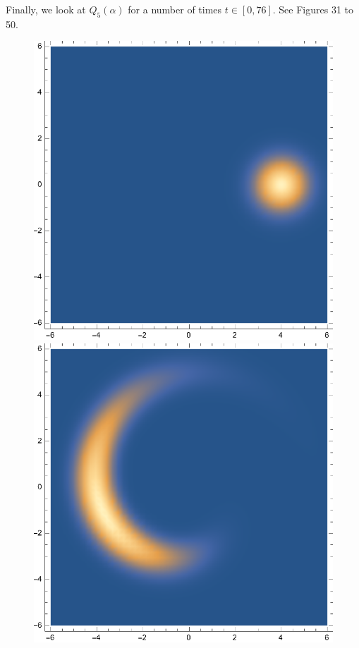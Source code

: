 \documentclass{article}
\theoremstyle{definition}
\newcommand{\al}{\alpha}
\begin{document}
\begin{enumerate}[label=\alph*)]
	Finally, we look at $Q_5(\al)$ for a number of times $t\in [0, 76]$. See Figures 31 to 50. 
	
	\begin{figure}[!htb]
	\centering
	\begin{minipage}{.24\textwidth}
  	\centering
  	\includegraphics[width=.7\linewidth]{figures/5-0.eps}
	\end{minipage}%
	\begin{minipage}{.24\textwidth}
  	\centering
  	\includegraphics[width=.7\linewidth]{figures/5-4.eps}
	\end{minipage}
	\begin{minipage}{.24\textwidth}
  	\centering

\end{minipage}
\end{figure}
\end{enumerate}
\end{document}
